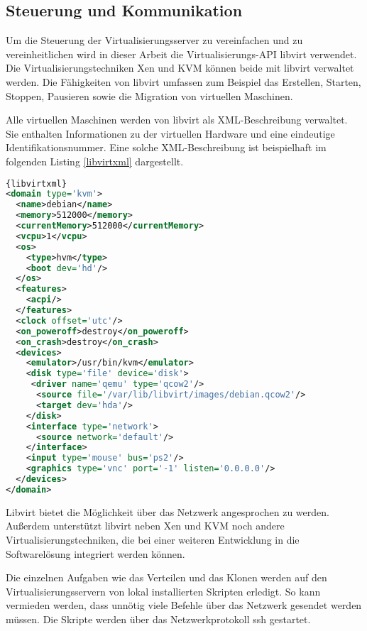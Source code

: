 \subsection{Steuerung und Kommunikation}
Um die Steuerung der Virtualisierungsserver zu vereinfachen und zu vereinheitlichen wird in dieser Arbeit die Virtualisierungs-API libvirt verwendet. Die Virtualisierungstechniken Xen und KVM können beide mit libvirt verwaltet werden. Die Fähigkeiten von libvirt umfassen zum Beispiel das Erstellen, Starten, Stoppen, Pausieren sowie die Migration von virtuellen Maschinen. 

Alle virtuellen Maschinen werden von libvirt als XML-Beschreibung verwaltet. Sie enthalten Informationen zu der virtuellen Hardware und eine eindeutige Identifikationsnummer. Eine solche XML-Beschreibung ist beispielhaft im folgenden Listing \ref{libvirtxml} dargestellt.
\\
\begin{lstlisting}[caption=libvirt-XML Beispiel,language=XML,label=libvirtxml]{libvirtxml}
<domain type='kvm'>
  <name>debian</name>
  <memory>512000</memory>
  <currentMemory>512000</currentMemory>
  <vcpu>1</vcpu>
  <os>
    <type>hvm</type>
    <boot dev='hd'/>
  </os>
  <features>
    <acpi/>
  </features>
  <clock offset='utc'/>
  <on_poweroff>destroy</on_poweroff>
  <on_crash>destroy</on_crash>
  <devices>
    <emulator>/usr/bin/kvm</emulator>
    <disk type='file' device='disk'>
     <driver name='qemu' type='qcow2'/>
      <source file='/var/lib/libvirt/images/debian.qcow2'/>
      <target dev='hda'/>
    </disk>
    <interface type='network'>
      <source network='default'/>
    </interface>
    <input type='mouse' bus='ps2'/>
    <graphics type='vnc' port='-1' listen='0.0.0.0'/>
  </devices>
</domain>
\end{lstlisting}

Libvirt bietet die Möglichkeit über das Netzwerk angesprochen zu werden. Außerdem unterstützt libvirt neben Xen und KVM noch andere Virtualisierungstechniken, die bei einer weiteren Entwicklung in die Softwarelösung integriert werden können. %

Die einzelnen Aufgaben wie das Verteilen und das Klonen werden auf den Virtualisierungsservern von lokal installierten Skripten erledigt. So kann vermieden werden, dass unnötig viele Befehle über das Netzwerk gesendet werden müssen. Die Skripte werden über das Netzwerkprotokoll ssh gestartet.


